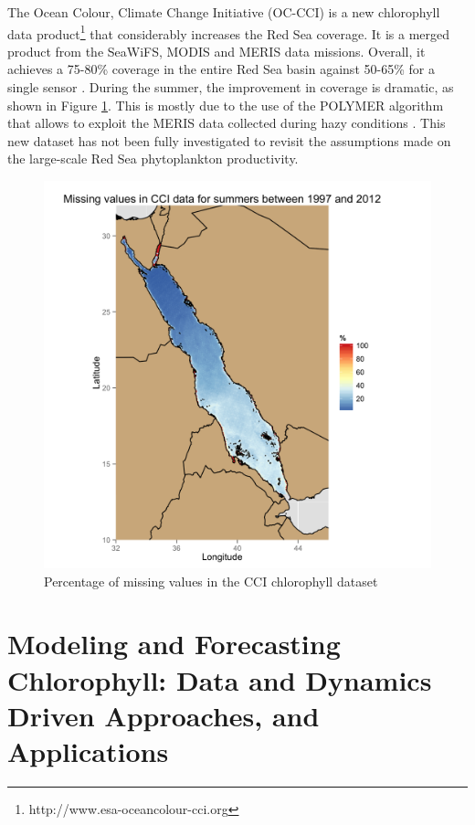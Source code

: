 The Ocean Colour, Climate Change Initiative (OC-CCI) is a new chlorophyll
data product\footnote{http://www.esa-oceancolour-cci.org} that considerably
increases the Red Sea coverage. It is a merged product from the SeaWiFS, MODIS
and MERIS data missions.  Overall, it achieves a 75-80\% coverage in the entire
Red Sea basin against 50-65\% for a single sensor \citep{Racault}. During the
summer, the improvement in coverage is dramatic, as shown in Figure
\ref{misval_cci}.  This is mostly due to the use of the POLYMER algorithm that
allows to exploit the MERIS data collected during hazy conditions
\citep{Steinmetz2011}. This new dataset has not been fully investigated to
revisit the assumptions made on the large-scale Red Sea phytoplankton
productivity.

\begin{figure}[h]
    \centering
    \includegraphics[scale=.15]{figures/cci_missing_values_summer.png}
    \caption{Percentage of missing values in the CCI chlorophyll dataset}
    \label{misval_cci}
\end{figure}

\section{Modeling and Forecasting Chlorophyll: Data and Dynamics Driven
Approaches, and Applications}


